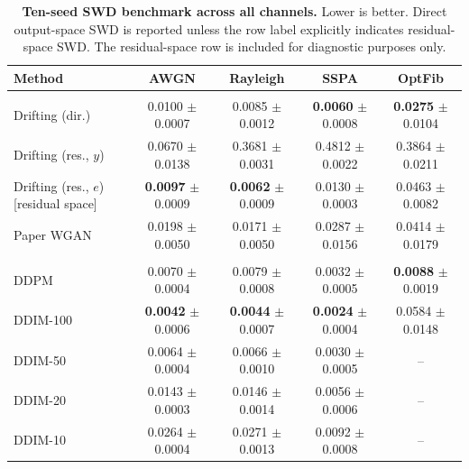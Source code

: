 \begin{table}[t]
\centering
\caption{\textbf{Ten-seed SWD benchmark across all channels.} Lower is better. Direct output-space SWD is reported unless the row label explicitly indicates residual-space SWD. The residual-space row is included for diagnostic purposes only.}
\label{tab:benchmark-all-channels}
\tablefontsize
\begin{tabular}{@{}lcccc@{}}
\toprule
Method & AWGN & Rayleigh & SSPA & OptFib \\
\midrule
\rowcolor[gray]{0.9} \multicolumn{5}{l}{\textit{One-shot generators}} \\
\headspace Drifting (dir.) & 0.0100 $\pm$ 0.0007 & 0.0085 $\pm$ 0.0012 & \textbf{0.0060} $\pm$ 0.0008 & \textbf{0.0275} $\pm$ 0.0104 \\
\headspace Drifting (res., $y$) & 0.0670 $\pm$ 0.0138 & 0.3681 $\pm$ 0.0031 & 0.4812 $\pm$ 0.0022 & 0.3864 $\pm$ 0.0211 \\
\headspace Drifting (res., $e$)[residual space] & \textbf{0.0097} $\pm$ 0.0009 & \textbf{0.0062} $\pm$ 0.0009 & 0.0130 $\pm$ 0.0003 & 0.0463 $\pm$ 0.0082 \\
\headspace Paper WGAN & 0.0198 $\pm$ 0.0050 & 0.0171 $\pm$ 0.0050 & 0.0287 $\pm$ 0.0156 & 0.0414 $\pm$ 0.0179 \\
\midrule
\rowcolor[gray]{0.9} \multicolumn{5}{l}{\textit{Diffusion samplers}} \\
\headspace DDPM & 0.0070 $\pm$ 0.0004 & 0.0079 $\pm$ 0.0008 & 0.0032 $\pm$ 0.0005 & \textbf{0.0088} $\pm$ 0.0019 \\
\headspace DDIM-100 & \textbf{0.0042} $\pm$ 0.0006 & \textbf{0.0044} $\pm$ 0.0007 & \textbf{0.0024} $\pm$ 0.0004 & 0.0584 $\pm$ 0.0148 \\
\headspace DDIM-50 & 0.0064 $\pm$ 0.0004 & 0.0066 $\pm$ 0.0010 & 0.0030 $\pm$ 0.0005 & -- \\
\headspace DDIM-20 & 0.0143 $\pm$ 0.0003 & 0.0146 $\pm$ 0.0014 & 0.0056 $\pm$ 0.0006 & -- \\
\headspace DDIM-10 & 0.0264 $\pm$ 0.0004 & 0.0271 $\pm$ 0.0013 & 0.0092 $\pm$ 0.0008 & -- \\
\bottomrule
\end{tabular}
\end{table}
